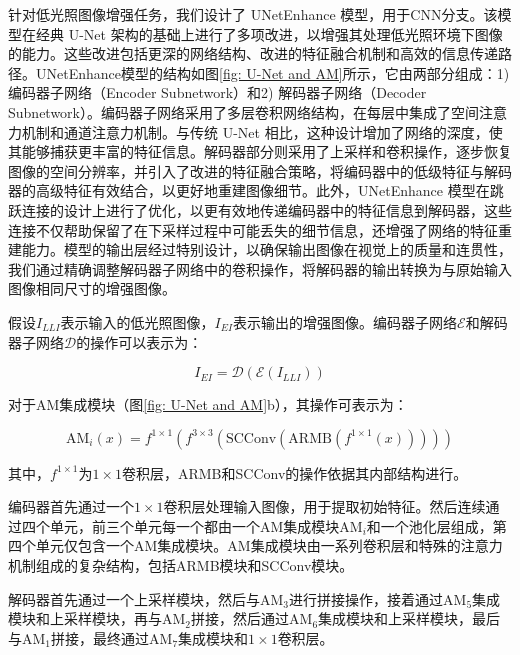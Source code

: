 \documentclass[a4paper]{ctexart}
\begin{document}
	针对低光照图像增强任务，我们设计了 UNetEnhance 模型，用于CNN分支。该模型在经典 U-Net 架构的基础上进行了多项改进，以增强其处理低光照环境下图像的能力。这些改进包括更深的网络结构、改进的特征融合机制和高效的信息传递路径。UNetEnhance模型的结构如图\ref{fig: U-Net and AM}所示，它由两部分组成：1) 编码器子网络（Encoder Subnetwork）和2) 解码器子网络（Decoder Subnetwork）。编码器子网络采用了多层卷积网络结构，在每层中集成了空间注意力机制和通道注意力机制\cite{woo2018cbam}。与传统 U-Net 相比，这种设计增加了网络的深度，使其能够捕获更丰富的特征信息。解码器部分则采用了上采样和卷积操作，逐步恢复图像的空间分辨率，并引入了改进的特征融合策略，将编码器中的低级特征与解码器的高级特征有效结合，以更好地重建图像细节。此外，UNetEnhance 模型在跳跃连接的设计上进行了优化，以更有效地传递编码器中的特征信息到解码器，这些连接不仅帮助保留了在下采样过程中可能丢失的细节信息，还增强了网络的特征重建能力。模型的输出层经过特别设计，以确保输出图像在视觉上的质量和连贯性，我们通过精确调整解码器子网络中的卷积操作，将解码器的输出转换为与原始输入图像相同尺寸的增强图像。
	
	假设$I_{LLI}$表示输入的低光照图像，$I_{EI}$表示输出的增强图像。编码器子网络$\mathcal{E}$和解码器子网络$\mathcal{D}$的操作可以表示为：
	
	\begin{equation}
		I_{EI} = \mathcal{D} \left( \mathcal{E} \left( I_{LLI} \right) \right)
	\end{equation}
	
	对于AM集成模块（图\ref{fig: U-Net and AM}b），其操作可表示为：
	
	\begin{equation}
		\text{AM}_{i}(x) = f^{1 \times 1} \left(f^{3 \times 3} \left(\text{SCConv}\left( \text{ARMB} \left( f^{1 \times 1} (x)\right)\right)\right)\right)
	\end{equation}
	
	其中，$f^{1\times1}$为$1 \times 1$卷积层，ARMB和SCConv的操作依据其内部结构进行。
	
	编码器首先通过一个$1 \times 1$卷积层处理输入图像，用于提取初始特征。然后连续通过四个单元，前三个单元每一个都由一个AM集成模块$\text{AM}_i$和一个池化层组成，第四个单元仅包含一个AM集成模块。AM集成模块由一系列卷积层和特殊的注意力机制组成的复杂结构，包括ARMB模块和SCConv模块。
	
	解码器首先通过一个上采样模块，然后与$\text{AM}_{3}$进行拼接操作，接着通过$\text{AM}_{5}$集成模块和上采样模块，再与$\text{AM}_{2}$拼接，然后通过$\text{AM}_{6}$集成模块和上采样模块，最后与$\text{AM}_{1}$拼接，最终通过$\text{AM}_{7}$集成模块和$1 \times 1$卷积层。
	
\end{document}
